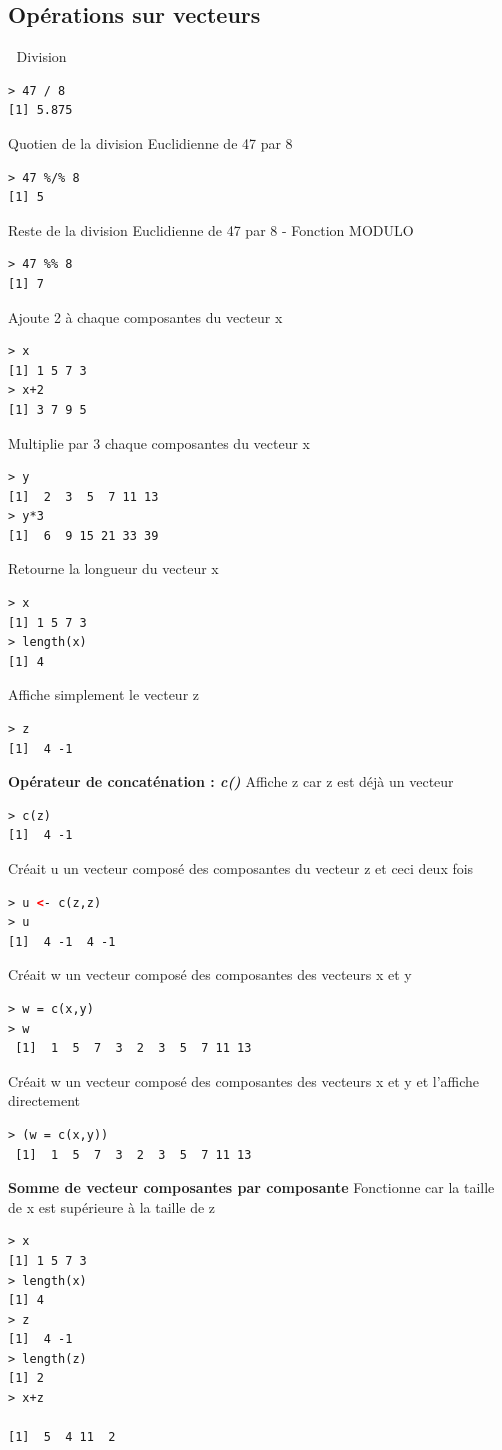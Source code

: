 \subsection{Opérations sur vecteurs}
\textcolor{white}{.}\newline
Division 
\begin{lstlisting}[language=html]
> 47 / 8
[1] 5.875
\end{lstlisting}
Quotien de la division Euclidienne de 47 par 8
\begin{lstlisting}[language=html]
> 47 %/% 8
[1] 5
\end{lstlisting}
Reste de la division Euclidienne de 47 par 8 - Fonction MODULO
\begin{lstlisting}[language=html]
> 47 %% 8
[1] 7
\end{lstlisting}
Ajoute 2 à chaque composantes du vecteur x
\begin{lstlisting}[language=html]
> x
[1] 1 5 7 3
> x+2
[1] 3 7 9 5
\end{lstlisting}
Multiplie par 3 chaque composantes du vecteur x
\begin{lstlisting}[language=html]
> y
[1]  2  3  5  7 11 13
> y*3
[1]  6  9 15 21 33 39
\end{lstlisting}
Retourne la longueur du vecteur x
\begin{lstlisting}[language=html]
> x
[1] 1 5 7 3
> length(x)
[1] 4
\end{lstlisting}
Affiche simplement le vecteur z
\begin{lstlisting}[language=html]
> z
[1]  4 -1
\end{lstlisting}
\textbf{Opérateur de concaténation : \textit{c()}}\newline
Affiche z car z est déjà un vecteur 
\begin{lstlisting}[language=html]
> c(z)
[1]  4 -1
\end{lstlisting}
Créait u un vecteur composé des composantes du vecteur z et ceci deux fois 
\begin{lstlisting}[language=html]
> u <- c(z,z)
> u
[1]  4 -1  4 -1
\end{lstlisting}
Créait w un vecteur composé des composantes des vecteurs x et y 
\begin{lstlisting}[language=html]
> w = c(x,y)
> w
 [1]  1  5  7  3  2  3  5  7 11 13
\end{lstlisting}
Créait w un vecteur composé des composantes des vecteurs x et y et l'affiche directement
\begin{lstlisting}[language=html]
> (w = c(x,y))
 [1]  1  5  7  3  2  3  5  7 11 13
\end{lstlisting}
\textbf{Somme de vecteur composantes par composante}\newline
Fonctionne car la taille de x est supérieure à la taille de z
\begin{lstlisting}[language=html]
> x
[1] 1 5 7 3
> length(x)
[1] 4
> z
[1]  4 -1
> length(z)
[1] 2
> x+z

[1]  5  4 11  2
\end{lstlisting}

